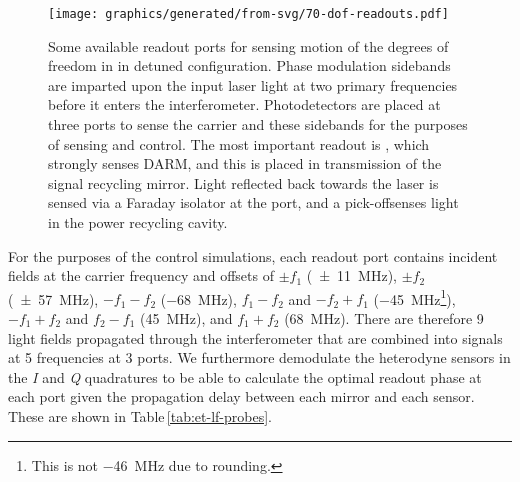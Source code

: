 \begin{figure}
  \centering
  \texttt{[image: graphics/generated/from-svg/70-dof-readouts.pdf]}
  \caption[Some available readout ports for sensing and control in \ETLF{} in detuned configuration]{\label{fig:dof-readouts}Some available readout ports for sensing motion of the degrees of freedom in \ETLF{} in detuned configuration. Phase modulation sidebands are imparted upon the input laser light at two primary frequencies before it enters the interferometer. Photodetectors are placed at three ports to sense the carrier and these sidebands for the purposes of sensing and control. The most important readout is \AS{}, which strongly senses \gls{DARM}, and this is placed in transmission of the signal recycling mirror. Light reflected back towards the laser is sensed via a Faraday isolator at the \REFL{} port, and a pick-off\textemdash \POP{}\textemdash senses light in the power recycling cavity.}
\end{figure}

For the purposes of the control simulations, each readout port contains incident fields at the carrier frequency and offsets of $\pm f_1$ (\SI{\pm11}{\mega\hertz}), $\pm f_2$ (\SI{\pm57}{\mega\hertz}), $-f_1 - f_2$ (\SI{-68}{\mega\hertz}), $f_1 - f_2$ and $-f_2 + f_1$ (\SI{-45}{\mega\hertz}\footnote{This is not \SI{-46}{\mega\hertz} due to rounding.}), $-f_1 + f_2$ and $f_2 - f_1$ (\SI{45}{\mega\hertz}), and $f_1 + f_2$ (\SI{68}{\mega\hertz}). There are therefore \num{9} light fields propagated through the interferometer that are combined into signals at \num{5} frequencies at \num{3} ports. We furthermore demodulate the heterodyne sensors in the \emph{I} and \emph{Q} quadratures to be able to calculate the optimal readout phase at each port given the propagation delay between each mirror and each sensor. These are shown in Table\,\ref{tab:et-lf-probes}.

